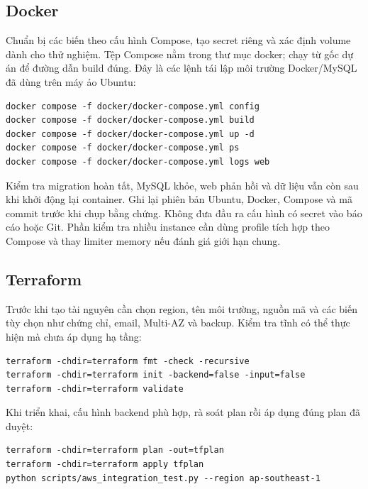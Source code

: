\subsection{Docker}
Chuẩn bị các biến theo cấu hình Compose, tạo secret riêng và xác định volume dành cho thử nghiệm. Tệp Compose nằm trong thư mục docker; chạy từ gốc dự án để đường dẫn build đúng. Đây là các lệnh tái lập môi trường Docker/MySQL đã dùng trên máy ảo Ubuntu:
\begin{verbatim}
docker compose -f docker/docker-compose.yml config
docker compose -f docker/docker-compose.yml build
docker compose -f docker/docker-compose.yml up -d
docker compose -f docker/docker-compose.yml ps
docker compose -f docker/docker-compose.yml logs web
\end{verbatim}
Kiểm tra migration hoàn tất, MySQL khỏe, web phản hồi và dữ liệu vẫn còn sau khi khởi động lại container. Ghi lại phiên bản Ubuntu, Docker, Compose và mã commit trước khi chụp bằng chứng. Không đưa đầu ra cấu hình có secret vào báo cáo hoặc Git. Phần kiểm tra nhiều instance cần dùng profile tích hợp theo Compose và thay limiter memory nếu đánh giá giới hạn chung.
\subsection{Terraform}
Trước khi tạo tài nguyên cần chọn region, tên môi trường, nguồn mã và các biến tùy chọn như chứng chỉ, email, Multi-AZ và backup. Kiểm tra tĩnh có thể thực hiện mà chưa áp dụng hạ tầng:
\begin{verbatim}
terraform -chdir=terraform fmt -check -recursive
terraform -chdir=terraform init -backend=false -input=false
terraform -chdir=terraform validate
\end{verbatim}
Khi triển khai, cấu hình backend phù hợp, rà soát plan rồi áp dụng đúng plan đã duyệt:
\begin{verbatim}
terraform -chdir=terraform plan -out=tfplan
terraform -chdir=terraform apply tfplan
python scripts/aws_integration_test.py --region ap-southeast-1
\end{verbatim}

\iffalse
